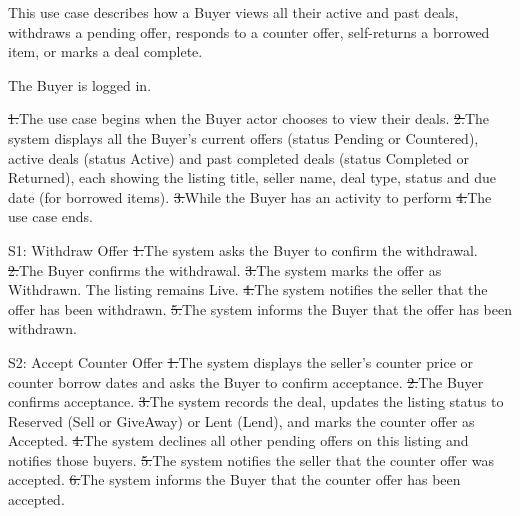 This use case describes how a Buyer views all their active and past deals, withdraws a pending offer, responds to a counter offer, self-returns a borrowed item, or marks a deal complete.\par
{}
The Buyer is logged in.\par
{}
\st{1.}{The use case begins when the Buyer actor chooses to view their deals.}
\st{2.}{The system displays all the Buyer's current offers (status Pending or Countered), active deals (status Active) and past completed deals (status Completed or Returned), each showing the listing title, seller name, deal type, status and due date (for borrowed items).}
\st{3.}{While the Buyer has an activity to perform}
\st{4.}{The use case ends.}
\begin{flowblock}{S1: Withdraw Offer}
\st{1.}{The system asks the Buyer to confirm the withdrawal.}
\st{2.}{The Buyer confirms the withdrawal.}
\st{3.}{The system marks the offer as Withdrawn. The listing remains Live.}
\st{4.}{The system notifies the seller that the offer has been withdrawn.}
\st{5.}{The system informs the Buyer that the offer has been withdrawn.}
\end{flowblock}
\begin{flowblock}{S2: Accept Counter Offer}
\st{1.}{The system displays the seller's counter price or counter borrow dates and asks the Buyer to confirm acceptance.}
\st{2.}{The Buyer confirms acceptance.}
\st{3.}{The system records the deal, updates the listing status to Reserved (Sell or GiveAway) or Lent (Lend), and marks the counter offer as Accepted.}
\st{4.}{The system declines all other pending offers on this listing and notifies those buyers.}
\st{5.}{The system notifies the seller that the counter offer was accepted.}
\st{6.}{The system informs the Buyer that the counter offer has been accepted.}
\end{flowblock}
